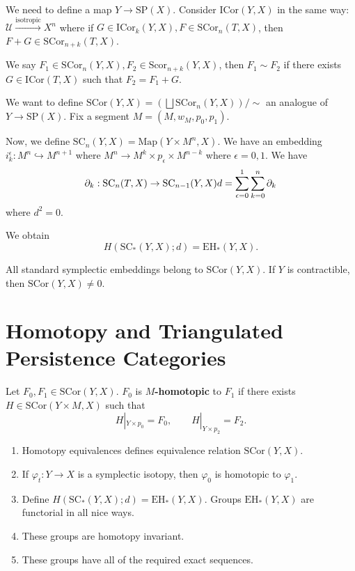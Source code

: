 We need to define a map $Y\to \text{SP}(X)$. Consider $\text{ICor}(Y,X)$ in the same way: $\mathcal{U}\stackrel{\text{isotropic}}{\longrightarrow} X^n$ where if $G\in \text{ICor}_k(Y,X), F\in \text{SCor}_n(T, X)$, then $F+G\in \text{SCor}_{n+k}(T,X)$.

\begin{definition}

We say $F_1\in \text{SCor}_n(Y,X), F_2 \in \text{Scor}_{n+k}(Y,X)$, then $F_1\sim F_2$ if there exists $G\in \text{ICor}(T,X)$ such that $F_2=F_1+G$.

\end{definition}

We want to define $\text{SCor}(Y,X)= \left(\bigsqcup \text{SCor}_n(Y,X) \right)/\sim$ an analogue of $Y\to \text{SP}(X)$. Fix a segment $M=(M, w_M, p_0, p_1)$.

Now, we define $\text{SC}_n(Y,X) = \text{Map}(Y\times M^n, X)$. We have an embedding $i_k^\epsilon: M^n \hookrightarrow M^{n+1}$ where $M^n \to M^k\times p_\epsilon \times M^{n-k}$ where $\epsilon =0,1$. We have
\[
\partial_k: \text{SC}_n(T,X) \to \text{SC}_{n-1}(Y,X)\\
d=\sum_{\epsilon=0}^1 \sum_{k=0}^n \partial_k
\]
where $d^2=0$.

We obtain
\[
H(\text{SC}_*(Y,X); d)=\text{EH}_*(Y, X).
\]

All standard symplectic embeddings belong to $\text{SCor}(Y,X)$. If $Y$ is contractible, then $\text{SCor}(Y,X)\neq 0$.

\section{Homotopy and Triangulated Persistence Categories}

\begin{definition}

Let $F_0, F_1 \in \text{SCor}(Y,X)$. $F_0$ is \textbf{$M$-homotopic} to $F_1$ if there exists $H\in \text{SCor}(Y\times M, X)$ such that
\[
H|_{Y\times p_0}=F_0, \qquad H|_{Y\times p_2}=F_2.
\]

\end{definition}

\begin{proposition}
\text{ }
\begin{enumerate}
\item Homotopy equivalences defines equivalence relation $\text{SCor}(Y,X)$.
\item If $\varphi_t: Y\to X$ is a symplectic isotopy, then $\varphi_0$ is homotopic to $\varphi_1$.
\item Define $H(\text{SC}_*(Y,X); d) = \text{EH}_*(Y,X)$. Groups $\text{EH}_*(Y,X)$ are functorial in all nice ways.
\item These groups are homotopy invariant.
\item These groups have all of the required exact sequences.
\end{enumerate}

\end{proposition}

